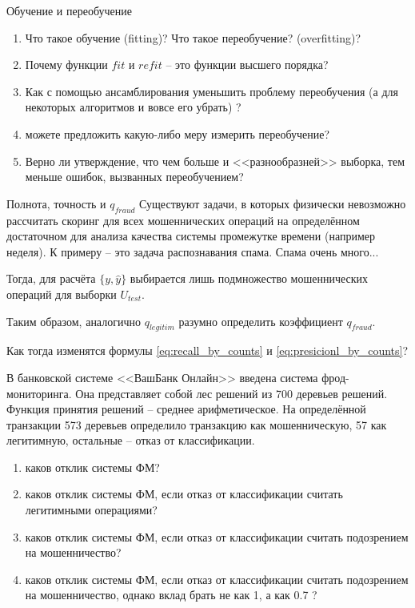   	\begin{frame}{Обучение и переобучение}
  		\begin{enumerate}
  			\item Что такое обучение (fitting)? Что такое переобучение? (overfitting)?
  			\item Почему функции $fit$ и $refit$ -- это функции высшего порядка?
  			\item Как с помощью ансамблирования уменьшить проблему переобучения (а для некоторых алгоритмов и вовсе его убрать) ?
  			\item можете предложить какую-либо меру измерить переобучение?
  			\item Верно ли утверждение, что чем больше и <<разнообразней>> выборка, тем меньше ошибок, вызванных переобучением?
  		\end{enumerate} 
	\end{frame}
  	
 \begin{frame}{Полнота, точность и $q_{fraud}$}
 		Существуют задачи, в которых физически невозможно рассчитать скоринг для всех 
 		мошеннических операций на определённом достаточном для анализа качества системы промежутке времени (например неделя).
 		К примеру -- это задача распознавания спама. Спама очень много...
 		
 		Тогда, для расчёта $\{y, \hat y\}$ выбирается лишь подмножество мошеннических операций для выборки $U_{test}$.
 		
 		Таким образом, аналогично $q_{legitim}$ разумно определить коэффициент $q_{fraud}$.
 		
 		Как тогда изменятся формулы \eqref{eq:recall_by_counts} и \eqref{eq:presicionl_by_counts}?
 \end{frame}
  
  
 \begin{frame}
  В банковской системе <<ВашБанк Онлайн>> введена система фрод-мониторинга. 
  Она представляет собой лес решений из 700 деревьев решений. Функция принятия решений -- среднее арифметическое. На определённой транзакции 573 деревьев определило транзакцию как мошенническую, 57 как легитимную, остальные -- отказ от классификации.
  \begin{enumerate}
  	\item каков отклик системы ФМ?
  	\item каков отклик системы ФМ, если отказ от классификации считать легитимными операциями?
  	\item каков отклик системы ФМ, если отказ от классификации считать подозрением на мошенничество?
  	\item каков отклик системы ФМ, если отказ от классификации считать подозрением на мошенничество, однако вклад брать не как 1, а как 0.7 ?
  \end{enumerate}
  
\end{frame}



